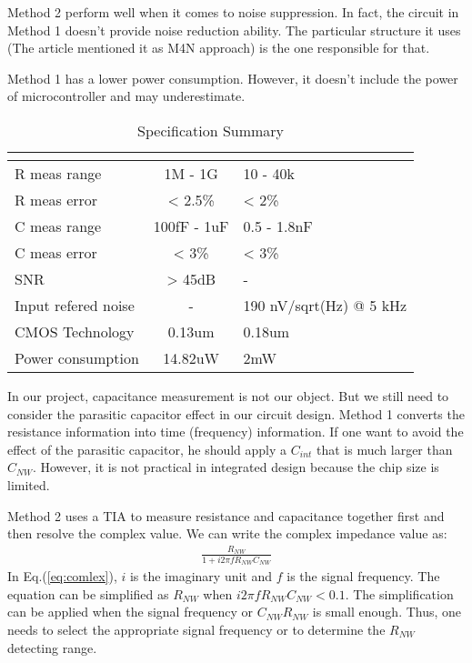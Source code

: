 Method 2 perform well when it comes to noise suppression.
In fact, the circuit in Method 1 doesn't provide noise reduction ability.
The particular structure it uses (The article \cite{Juv1} mentioned it as M4N approach) is the one responsible for that.

Method 1 has a lower power consumption. However, it doesn't include the power of microcontroller and may underestimate.

\begin{table}[!htb]
    {\fontfamily{}\fontsize{10}{14}\selectfont
    \centering
    \begin{tabular}{l|cp{4cm}}
        & \cite{Juv2} & \cite{Jlockin}\\
        \hline
        R meas range & 1M - 1G & 10 - 40k\\
        \hline
        R meas error & < 2.5\% & < 2\%\\
        \hline
        C meas range & 100fF - 1uF & 0.5 - 1.8nF\\
        \hline
        C meas error & < 3\% & < 3\%\\
        \hline
        SNR & > 45dB & - \\
        \hline
        Input refered noise & - & 190 nV/sqrt(Hz) @ 5 kHz \\
        \hline
        CMOS Technology & 0.13um & 0.18um\\
        \hline
        Power consumption & 14.82uW & 2mW\\
    \end{tabular}
    \caption{Specification Summary}
    \label{tb:LVtable}
    }
\end{table}

In our project, capacitance measurement is not our object.
But we still need to consider the parasitic capacitor effect in our circuit design.
Method 1 converts the resistance information into time (frequency) information.
If one want to avoid the effect of the parasitic capacitor, he should apply a $C_{int}$ that is much larger than $C_{NW}$.
However, it is not practical in integrated design because the chip size is limited.

Method 2 uses a TIA to measure resistance and capacitance together first and then resolve the complex value.
We can write the complex impedance value as:
\begin{align}
      \frac{R_{NW}}{1 + i2\pi f R_{NW} C_{NW}} \label{eq:comlex}
\end{align}
In Eq.(\ref{eq:comlex}), $i$ is the imaginary unit and $f$ is the signal frequency.
The equation can be simplified as $R_{NW}$ when $i2\pi f R_{NW} C_{NW} < 0.1$.
The simplification can be applied when the signal frequency or $C_{NW} R_{NW}$ is small enough.
Thus, one needs to select the appropriate signal frequency or to determine the $R_{NW}$ detecting range.


